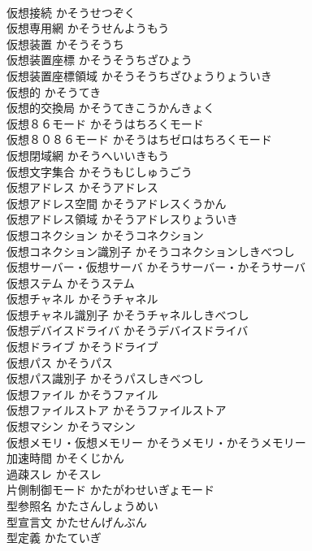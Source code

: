 \documentclass[8pt]{extreport}
\begin{document}
\begin{CJK}{UTF8}{min}
\\	仮想接続	かそうせつぞく	
\\	仮想専用網	かそうせんようもう	
\\	仮想装置	かそうそうち	
\\	仮想装置座標	かそうそうちざひょう	
\\	仮想装置座標領域	かそうそうちざひょうりょういき	
\\	仮想的	かそうてき	
\\	仮想的交換局	かそうてきこうかんきょく	
\\	仮想８６モード	かそうはちろくモード	
\\	仮想８０８６モード	かそうはちゼロはちろくモード	
\\	仮想閉域網	かそうへいいきもう	
\\	仮想文字集合	かそうもじしゅうごう	
\\	仮想アドレス	かそうアドレス	
\\	仮想アドレス空間	かそうアドレスくうかん	
\\	仮想アドレス領域	かそうアドレスりょういき	
\\	仮想コネクション	かそうコネクション	
\\	仮想コネクション識別子	かそうコネクションしきべつし	
\\	仮想サーバー・仮想サーバ	かそうサーバー・かそうサーバ	
\\	仮想ステム	かそうステム	
\\	仮想チャネル	かそうチャネル	
\\	仮想チャネル識別子	かそうチャネルしきべつし	
\\	仮想デバイスドライバ	かそうデバイスドライバ	
\\	仮想ドライブ	かそうドライブ	
\\	仮想パス	かそうパス	
\\	仮想パス識別子	かそうパスしきべつし	
\\	仮想ファイル	かそうファイル	
\\	仮想ファイルストア	かそうファイルストア	
\\	仮想マシン	かそうマシン	
\\	仮想メモリ・仮想メモリー	かそうメモリ・かそうメモリー	
\\	加速時間	かそくじかん	
\\	過疎スレ	かそスレ	
\\	片側制御モード	かたがわせいぎょモード	
\\	型参照名	かたさんしょうめい	
\\	型宣言文	かたせんげんぶん	
\\	型定義	かたていぎ	

\end{CJK}
\end{document}
